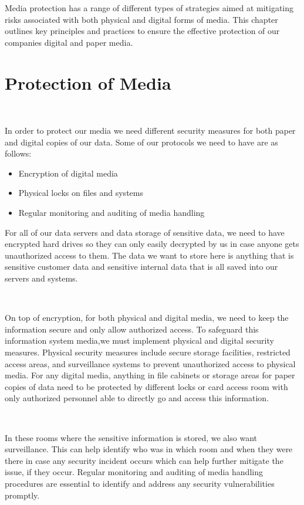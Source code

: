 \documentclass[12pt,a4paper]{report}
\begin{document}
Media protection has a range of different types of strategies aimed at mitigating risks associated with both physical and digital forms of media. 
This chapter outlines key principles and practices to ensure the effective protection of our companies digital and paper media.

\section{Protection of Media}
\

In order to protect our media we need different security measures for both paper and digital copies of our data. Some of our protocols we need to have are as follows:
\begin{itemize}
 \item Encryption of digital media
 \item Physical locks on files and systems
 \item Regular monitoring and auditing of media handling
\end{itemize}

For all of our data servers and data storage of sensitive data, we need to have encrypted hard drives so they can only easily decrypted by us in case anyone gets unauthorized access to them.
The data we want to store here is anything that is sensitive customer data and sensitive internal data that is all saved into our servers and systems.

\

On top of encryption, for both physical and digital media, we need to keep the information secure and only allow authorized access.
To safeguard this information system media,we must implement physical and digital security measures. 
Physical security measures include secure storage facilities, restricted access areas, and surveillance systems to prevent unauthorized access to physical media. 
For any digital media, anything in file cabinets or storage areas for paper copies of data need to be protected by different locks or card access room with only authorized personnel able to directly go and access this information.

\

In these rooms where the sensitive information is stored, we also want surveillance. 
This can help identify who was in which room and when they were there in case any security incident occurs which can help further mitigate the issue, if they occur.
Regular monitoring and auditing of media handling procedures are essential to identify and address any security vulnerabilities promptly. 
\end{document}
